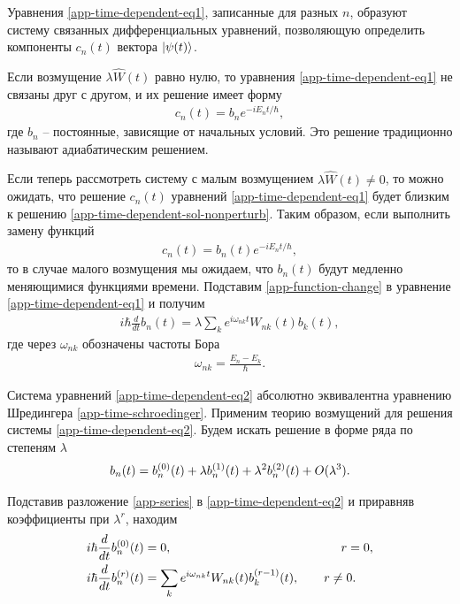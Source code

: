 \begin{subappendices}
Уравнения \eqref{app-time-dependent-eq1}, записанные для разных $n$, образуют систему связанных дифференциальных уравнений, позволяющую определить компоненты $c_n(t)$ вектора $\ket{\psi(t)}$. \par
Если возмущение $\lambda \hat{W}(t)$ равно нулю, то уравнения \eqref{app-time-dependent-eq1} не связаны друг с другом, и их решение имеет форму
\begin{gather}
    c_n(t) = b_n e^{-i E_n t / \hbar}, \label{app-time-dependent-sol-nonperturb}
\end{gather}
где $b_n$ -- постоянные, зависящие от начальных условий. Это решение традиционно называют адиабатическим решением. \par
Если теперь рассмотреть систему с малым возмущением $\lambda \hat{W}(t) \neq 0$, то можно ожидать, что решение $c_n(t)$ уравнений \eqref{app-time-dependent-eq1} будет близким к решению \eqref{app-time-dependent-sol-nonperturb}. Таким образом, если выполнить замену функций
\begin{gather}
    c_n(t) = b_n(t) e^{-i E_n t / \hbar}, \label{app-function-change}
\end{gather}
то в случае малого возмущения мы ожидаем, что $b_n(t)$ будут медленно меняющимися функциями времени. Подставим \eqref{app-function-change} в уравнение \eqref{app-time-dependent-eq1} и получим
\begin{gather}
    i \hbar \frac{d}{dt} b_n(t) = \lambda \sum_k e^{i \omega_{nk} t} W_{nk}(t) b_k(t), \label{app-time-dependent-eq2} 
\end{gather}
где через $\omega_{nk}$ обозначены частоты Бора
\begin{gather}
    \omega_{nk} = \frac{E_n - E_k}{\hbar}.
\end{gather}

Система уравнений \eqref{app-time-dependent-eq2} абсолютно эквивалентна уравнению Шредингера \eqref{app-time-schroedinger}. Применим теорию возмущений для решения системы \eqref{app-time-dependent-eq2}. Будем искать решение в форме ряда по степеням $\lambda$
\begin{gather}
    b_n(t) = b_n^{(0)}(t) + \lambda b_n^{(1)}(t) + \lambda^2 b_n^{(2)}(t) + O(\lambda^3). \label{app-series}
\end{gather}

Подставив разложение \eqref{app-series} в \eqref{app-time-dependent-eq2} и приравняв коэффициенты при $\lambda^r$, находим
\begin{gather}
    \begin{aligned}
        i \hbar \frac{d}{dt} \bnp{0}(t) &= 0, \hspace{4.82cm} r = 0,  \\
        i \hbar \frac{d}{dt} \bnp{r}(t) &= \sum_k e^{i \omega_{nk} t} W_{nk}(t) b_k^{(r-1)}(t), \qquad r \neq 0.
    \end{aligned} \label{app-equations-for-coefficients}
\end{gather}


\end{subappendices}
